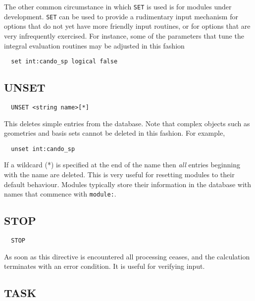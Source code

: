 The other common circumstance in which \verb+SET+ is used is for
modules under development.  \verb+SET+ can be used to provide a
rudimentary input mechanism for options that do not yet have more
friendly input routines, or for options that are very infrequently
exercised.  For instance, some of the parameters that tune the
integral evaluation routines may be adjusted in this fashion
\begin{verbatim}
  set int:cando_sp logical false
\end{verbatim}

\subsection{UNSET}
\label{sec:unset}

\begin{verbatim}
  UNSET <string name>[*]
\end{verbatim}

This deletes simple entries from the database.  Note that complex
objects such as geometries and basis sets cannot be deleted in this
fashion.  For example, 
\begin{verbatim}
  unset int:cando_sp
\end{verbatim}

If a wildcard (*) is specified at the end of the name then {\em all}
entries beginning with the name are deleted.  This is very useful for
resetting modules to their default behaviour.  Modules typically store
their information in the database with names that commence with
\verb+module:+.

\subsection{STOP}

\begin{verbatim}
  STOP
\end{verbatim}

As soon as this directive is encountered all processing ceases, and
the calculation terminates with an error condition.  It is useful for
verifying input.

\subsection{TASK}
\label{sec:task}

